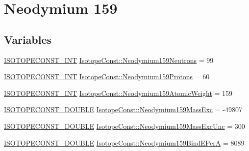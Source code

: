 \hypertarget{group___isotope_const-_neodymium-_nd159}{}\section{Neodymium 159}
\label{group___isotope_const-_neodymium-_nd159}
\subsection*{Variables}
\begin{DoxyCompactItemize}
\item 
\mbox{\hyperlink{group___isotope_const-_macros_ga5f18360b3e99483a35c32d789e62621c}{I\+S\+O\+T\+O\+P\+E\+C\+O\+N\+S\+T\+\_\+\+I\+NT}} \mbox{\hyperlink{group___isotope_const-_neodymium-_nd159_ga376081a8d653eebce857253180c9c910}{Isotope\+Const\+::\+Neodymium159\+Neutrons}} = 99
\item 
\mbox{\hyperlink{group___isotope_const-_macros_ga5f18360b3e99483a35c32d789e62621c}{I\+S\+O\+T\+O\+P\+E\+C\+O\+N\+S\+T\+\_\+\+I\+NT}} \mbox{\hyperlink{group___isotope_const-_neodymium-_nd159_ga4a635686660452cade862db9a4c87c1a}{Isotope\+Const\+::\+Neodymium159\+Protons}} = 60
\item 
\mbox{\hyperlink{group___isotope_const-_macros_ga5f18360b3e99483a35c32d789e62621c}{I\+S\+O\+T\+O\+P\+E\+C\+O\+N\+S\+T\+\_\+\+I\+NT}} \mbox{\hyperlink{group___isotope_const-_neodymium-_nd159_ga4ad2bd810f600cbd48a4818de4ff55bf}{Isotope\+Const\+::\+Neodymium159\+Atomic\+Weight}} = 159
\item 
\mbox{\hyperlink{group___isotope_const-_macros_ga8f45a7272ce02c0b4c65c44636ed719a}{I\+S\+O\+T\+O\+P\+E\+C\+O\+N\+S\+T\+\_\+\+D\+O\+U\+B\+LE}} \mbox{\hyperlink{group___isotope_const-_neodymium-_nd159_ga00e2a602096bab7b26c25c3570c7ec23}{Isotope\+Const\+::\+Neodymium159\+Mass\+Exc}} = -\/49807
\item 
\mbox{\hyperlink{group___isotope_const-_macros_ga8f45a7272ce02c0b4c65c44636ed719a}{I\+S\+O\+T\+O\+P\+E\+C\+O\+N\+S\+T\+\_\+\+D\+O\+U\+B\+LE}} \mbox{\hyperlink{group___isotope_const-_neodymium-_nd159_ga9d236a2bea004332be4352afb9245693}{Isotope\+Const\+::\+Neodymium159\+Mass\+Exc\+Unc}} = 300
\item 
\mbox{\hyperlink{group___isotope_const-_macros_ga8f45a7272ce02c0b4c65c44636ed719a}{I\+S\+O\+T\+O\+P\+E\+C\+O\+N\+S\+T\+\_\+\+D\+O\+U\+B\+LE}} \mbox{\hyperlink{group___isotope_const-_neodymium-_nd159_gad73f159762456e0efda9e67be7026222}{Isotope\+Const\+::\+Neodymium159\+Bind\+E\+PerA}} = 8089
\item 

\end{DoxyCompactItemize}
